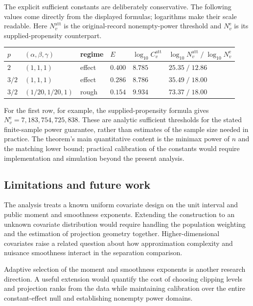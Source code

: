 \documentclass[11pt]{article}
\begin{document}
The explicit sufficient constants are deliberately conservative. The following values come directly from the displayed formulas; logarithms make their scale readable. Here \(N_v^{\mathrm{att}}\) is the original-record nonempty-power threshold and \(N_v^{\mathrm e}\) is its supplied-propensity counterpart.
\begin{center}
\begin{tabular}{llllll}
\hline
\(p\) & \((\alpha,\beta,\gamma)\) & regime & \(E\) & \(\log_{10}C_v^{\mathrm{att}}\) & \(\log_{10}N_v^{\mathrm{att}}\; /\;\log_{10}N_v^{\mathrm e}\) \\
\hline
\(2\) & \((1,1,1)\) & effect & \(0.400\) & \(8.785\) & \(25.35\;/\;12.86\) \\
\(3/2\) & \((1,1,1)\) & effect & \(0.286\) & \(8.786\) & \(35.49\;/\;18.00\) \\
\(3/2\) & \((1/20,1/20,1)\) & rough & \(0.154\) & \(9.934\) & \(73.37\;/\;18.00\) \\
\hline
\end{tabular}
\end{center}
For the first row, for example, the supplied-propensity formula gives \(N_v^{\mathrm e}=7{,}183{,}754{,}725{,}838\). These are analytic sufficient thresholds for the stated finite-sample power guarantee, rather than estimates of the sample size needed in practice. The theorem's main quantitative content is the minimax power of \(n\) and the matching lower bound; practical calibration of the constants would require implementation and simulation beyond the present analysis.

\subsection{Limitations and future work}

The analysis treats a known uniform covariate design on the unit interval and public moment and smoothness exponents. Extending the construction to an unknown covariate distribution would require handling the population weighting and the estimation of projection geometry together. Higher-dimensional covariates raise a related question about how approximation complexity and nuisance smoothness interact in the separation comparison.

Adaptive selection of the moment and smoothness exponents is another research direction. A useful extension would quantify the cost of choosing clipping levels and projection ranks from the data while maintaining calibration over the entire constant-effect null and establishing nonempty power domains.
\end{document}
